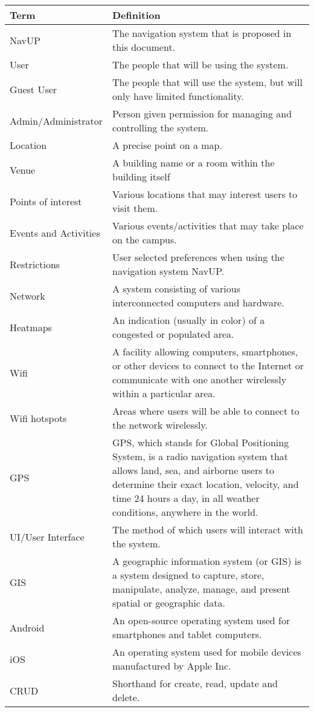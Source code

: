 \begin{center}
    \begin{tabular}{| l | p{8cm} |}
    \hline
    \textbf{Term} & \textbf{Definition} \\ \hline
	NavUP & The navigation system that is proposed in this document. \\ \hline
	User & The people that will be using the system. \\ \hline
	Guest User & The people that will use the system, but will only have limited functionality. \\ \hline
	Admin/Administrator & Person given permission for managing and controlling the system. \\ \hline
	Location & A precise point on a map. \\ \hline
	Venue & A building name or a room within the building itself \\ \hline
	Points of interest & Various locations that may interest users to visit them. \\ \hline
	Events and Activities & Various events/activities that may take place on the campus. \\ \hline
	Restrictions & User selected preferences when using the navigation system NavUP. \\ \hline
	Network & A system consisting of various interconnected computers and hardware. \\ \hline
	Heatmaps & An indication (usually in color) of a congested or populated area. \\ \hline
	Wifi & A facility allowing computers, smartphones, or other devices to connect to the Internet or communicate with one another wirelessly within a particular area. \\ \hline
	Wifi hotspots & Areas where users will be able to connect to the network wirelessly. \\ \hline    
	GPS & GPS, which stands for Global Positioning System, is a radio navigation system that allows land, sea, and airborne users to determine their exact location, velocity, and time 24 hours a day, in all weather conditions, anywhere in the world. \\ \hline
	UI/User Interface & The method of which users will interact with the system. \\ \hline
	GIS & A geographic information system (or GIS) is a system designed to capture, store, manipulate, analyze, manage, and present spatial or geographic data. \\ \hline
	Android & An open-source operating system used for smartphones and tablet computers. \\ \hline
	iOS & An operating system used for mobile devices manufactured by Apple Inc. \\ \hline
  CRUD & Shorthand for create, read, update and delete. \\ \hline
    \end{tabular}
\end{center}
